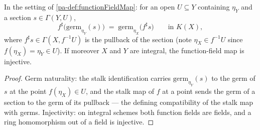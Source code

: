 \begin{lemma}
  \label{pa-lem:functionFieldMap_germ}
  \leanok

  In the setting of \ref{pa-def:functionFieldMap}: for an open \(U \subseteq Y\) containing
  \(\eta_Y\) and a section \(s \in \Gamma(Y, U)\),
  \[
    f^{\sharp}\bigl(\mathrm{germ}_{\eta_Y}(s)\bigr)
      \;=\; \mathrm{germ}_{\eta_X}\bigl(f^{\sharp}s\bigr)
      \qquad \text{in } K(X),
  \]
  where \(f^{\sharp}s \in \Gamma(X, f^{-1}U)\) is the pullback of the section (note
  \(\eta_X \in f^{-1}U\) since \(f(\eta_X) = \eta_Y \in U\)). If moreover \(X\) and
  \(Y\) are integral, the function-field map is injective.
\end{lemma}
\begin{proof}
  \leanok
  Germ naturality: the stalk identification carries \(\mathrm{germ}_{\eta_Y}(s)\) to the
  germ of \(s\) at the point \(f(\eta_X) \in U\), and the stalk map of \(f\) at a point
  sends the germ of a section to the germ of its pullback --- the defining compatibility
  of the stalk map with germs. Injectivity: on integral schemes both function fields are
  fields, and a ring homomorphism out of a field is injective.
\end{proof}


